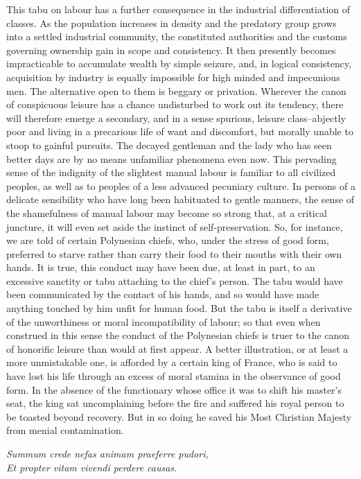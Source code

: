 \documentclass[12pt]{report}
\begin{document}
This tabu on labour has a further consequence in the industrial
differentiation of classes. As the population increases in density
and the predatory group grows into a settled industrial community, the
constituted authorities and the customs governing ownership gain in
scope and consistency. It then presently becomes impracticable to
accumulate wealth by simple seizure, and, in logical consistency,
acquisition by industry is equally impossible for high minded and
impecunious men. The alternative open to them is beggary or privation.
Wherever the canon of conspicuous leisure has a chance undisturbed to
work out its tendency, there will therefore emerge a secondary, and in a
sense spurious, leisure class--abjectly poor and living in a precarious
life of want and discomfort, but morally unable to stoop to gainful
pursuits. The decayed gentleman and the lady who has seen better days
are by no means unfamiliar phenomena even now. This pervading sense
of the indignity of the slightest manual labour is familiar to all
civilized peoples, as well as to peoples of a less advanced pecuniary
culture. In persons of a delicate sensibility who have long been
habituated to gentle manners, the sense of the shamefulness of manual
labour may become so strong that, at a critical juncture, it will even
set aside the instinct of self-preservation. So, for instance, we are
told of certain Polynesian chiefs, who, under the stress of good form,
preferred to starve rather than carry their food to their mouths with
their own hands. It is true, this conduct may have been due, at least in
part, to an excessive sanctity or tabu attaching to the chief's person.
The tabu would have been communicated by the contact of his hands, and
so would have made anything touched by him unfit for human food. But the
tabu is itself a derivative of the unworthiness or moral incompatibility
of labour; so that even when construed in this sense the conduct of the
Polynesian chiefs is truer to the canon of honorific leisure than would
at first appear. A better illustration, or at least a more unmistakable
one, is afforded by a certain king of France, who is said to have lost
his life through an excess of moral stamina in the observance of good
form. In the absence of the functionary whose office it was to shift his
master's seat, the king sat uncomplaining before the fire and suffered
his royal person to be toasted beyond recovery. But in so doing he saved
his Most Christian Majesty from menial contamination. 
\begin{displayquote}
\emph{
Summum crede nefas animam praeferre pudori, \\
Et propter vitam vivendi perdere causas.}
\end{displayquote}
\end{document}
